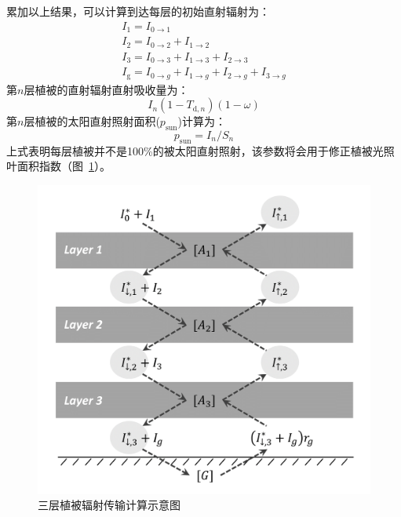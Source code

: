 累加以上结果，可以计算到达每层的初始直射辐射为：
\begin{equation}
  \begin{array}{l}I_{1}=I_{0 \rightarrow 1} \\ I_{2}=I_{0 \rightarrow 2}+I_{1 \rightarrow 2} \\
    I_{3}=I_{0 \rightarrow 3}+I_{1 \rightarrow 3}+I_{2 \rightarrow 3} \\
  I_{\mathrm g}=I_{0 \rightarrow g}+I_{1 \rightarrow g}+I_{2 \rightarrow g}+I_{3 \rightarrow g}\end{array}
\end{equation}
第$n$层植被的直射辐射直射吸收量为：
\begin{equation}
  I_{n}\left(1-T_{\mathrm{d}, n}\right)(1-\omega)
\end{equation}
第$n$层植被的太阳直射照射面积($p_{\mathrm{sun}}$)计算为：
\begin{equation}
  p_{\mathrm{sun}}=I_{n} / S_{n}
\end{equation}
上式表明每层植被并不是100\%的被太阳直射照射，该参数将会用于修正植被光照叶面积指数（图~\ref{fig:三层植被辐射传输计算示意图}）。
{
  \begin{figure}[htbp]
    \centering
    \includegraphics[width=0.7\columnwidth]{Figures/辐射过程及辐射通量计算/三层植被辐射传输计算示意图.png}
    \caption{三层植被辐射传输计算示意图}
    \label{fig:三层植被辐射传输计算示意图}
  \end{figure}
}

